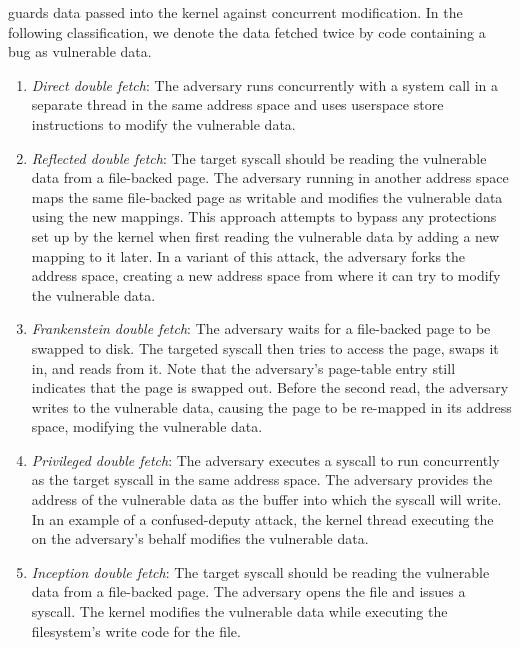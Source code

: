 \documentclass[letterpaper,twocolumn,10pt, anonymous]{article}
\begin{document}
\tiktok guards data passed into the kernel against concurrent modification.
In the following classification, we denote the data fetched twice
by code containing a \tocttou bug as vulnerable data.
\begin{enumerate}
  \item \label{attk:direct} \emph{Direct double fetch}: The adversary runs
  concurrently with a system call in a separate thread in the same address space
  and uses userspace store instructions to modify the vulnerable data.

  \item \label{attk:remapping} \emph{Reflected double fetch}: The target
  syscall should be reading the vulnerable data from a file-backed page.
  The adversary running in another address space maps the same file-backed page
  as writable and modifies the vulnerable data using the new mappings.
  This approach attempts to bypass any protections set up by the kernel
  when first reading the vulnerable data by adding a new mapping to it later.
  In a variant of this attack, the adversary forks the address space, 
  creating a new address space from where it can try to modify the vulnerable 
  data.

  \item \label{attk:swap} \emph{Frankenstein double fetch}: The adversary
  waits for a file-backed page to be swapped to disk. 
  The targeted syscall then tries to access the page, swaps it in, and 
  reads from it. 
  Note that the adversary's page-table entry still indicates that the page
  is swapped out.
  Before the second read, the adversary writes to the vulnerable data, 
  causing the page to be re-mapped in its address space, modifying the 
  vulnerable data.

  \item \label{attk:systemcall} \emph{Privileged double fetch}: The adversary
  executes a  syscall to run concurrently as the target syscall in 
  the same address space. 
  The adversary provides the address of the vulnerable data as the buffer 
  into which the  syscall will write.
  In an example of a confused-deputy attack, the kernel thread executing the
   on the adversary's behalf modifies the vulnerable data.

  \item \label{attk:writebuffers} \emph{Inception double fetch}: The 
  target syscall should be reading the vulnerable data from a file-backed 
  page. The adversary opens the file and issues a  syscall.
  The kernel modifies the vulnerable data while executing the filesystem's
  write code for the file.


\end{enumerate}
\end{document}
